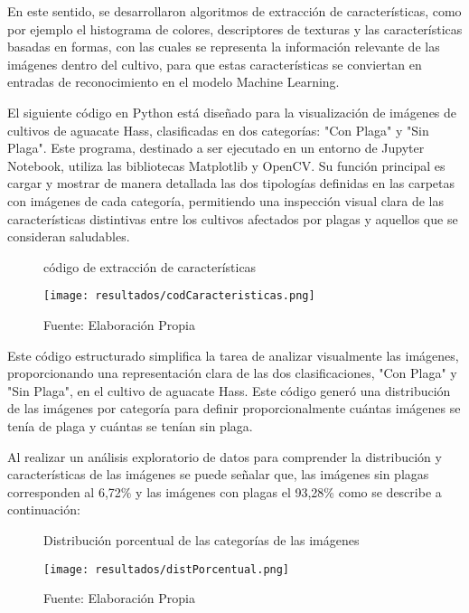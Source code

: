 En este sentido, se desarrollaron algoritmos de extracción de características, como por ejemplo el histograma de colores, descriptores de texturas y las características basadas en formas, con las cuales se representa la información relevante de las imágenes dentro del cultivo, para que estas características se conviertan en entradas de reconocimiento en el modelo Machine Learning.

El siguiente código en Python está diseñado para la visualización de imágenes de cultivos de aguacate Hass, clasificadas en dos categorías: "Con Plaga" y "Sin Plaga". Este programa, destinado a ser ejecutado en un entorno de Jupyter Notebook, utiliza las bibliotecas Matplotlib y OpenCV. Su función principal es cargar y mostrar de manera detallada las dos tipologías definidas en las carpetas con imágenes de cada categoría, permitiendo una inspección visual clara de las características distintivas entre los cultivos afectados por plagas y aquellos que se consideran saludables.

\newpage

\begin{figure}[h]
\centering
\caption{código de extracción de características}
\texttt{[image: resultados/codCaracteristicas.png]}
\caption*{\footnotesize Fuente: Elaboración Propia}
\label{fig:figuraCodCaracteristicas}
\end{figure}

Este código estructurado simplifica la tarea de analizar visualmente las imágenes, proporcionando una representación clara de las dos clasificaciones, "Con Plaga" y "Sin Plaga", en el cultivo de aguacate Hass. Este código  generó una distribución de las imágenes por categoría para definir proporcionalmente cuántas imágenes se tenía de plaga y cuántas se tenían sin plaga.

Al realizar un análisis exploratorio de datos para comprender la distribución y características de las imágenes se puede señalar que, las imágenes sin plagas corresponden al 6,72\% y las imágenes con plagas el 93,28\% como se describe a continuación:

\newpage

\begin{figure}[h]
\centering
\caption{Distribución porcentual de las categorías de las imágenes}
\texttt{[image: resultados/distPorcentual.png]}
\caption*{\footnotesize Fuente: Elaboración Propia}
\label{fig:figuraDistPorcentual}
\end{figure}

